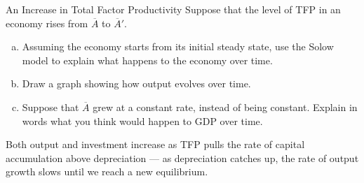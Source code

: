 \documentclass[8pt]{extarticle}
\begin{document}
\begin{problem}{An Increase in Total Factor Productivity}
  Suppose that the level of TFP in an economy rises from $\overline{A}$ to $\overline{A}'$.
  \begin{enumerate}[(a)]
    \item Assuming the economy starts from its initial steady state, use the Solow model to explain what happens to the economy over time. 
    \item Draw a graph showing how output evolves over time.
    \item Suppose that $\overline{A}$ grew at a constant rate, instead of being constant. Explain in words what you think would happen to GDP over time.
  \end{enumerate}
\end{problem}
\begin{solution}
  \begin{tcolorbox}[colframe = black!75!white, title = (a), colback = white]
    Both output and investment increase as TFP pulls the rate of capital accumulation above depreciation --- as depreciation catches up, the rate of output growth slows until we reach a new equilibrium.
  \end{tcolorbox}
  \begin{tcolorbox}[title = (b), colback = white, breakable]
      \begin{center}
        \\
    \begin{tikzpicture}

\end{tikzpicture}
\end{center}
\end{tcolorbox}
\end{solution}
\end{document}
